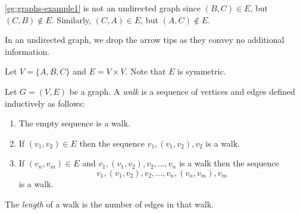 \documentclass{amsart}
\begin{document}
\begin{rmk}
  \label{rmk:example1-not-undirected}
  \cref{eg:graphs-example1} is not an undirected graph since $(B,C) \in E$, but $(C,B) \notin E$.
  Similarly, $(C,A) \in E$, but $(A,C) \notin E$.
\end{rmk}

\begin{rmk}
  \label{rmk:drop-arrows-in-undirected-graphs}
  In an undirected graph, we drop the arrow tips as they convey no additional information.
\end{rmk}

\begin{eg}
  \label{eg:graphs-example2}
  Let $V = \{A, B, C\}$ and $E = V \times V$.
  Note that $E$ is symmetric.
  \begin{center}
  \end{center}
\end{eg}

\begin{defn}
  \label{defn:walks}
  Let $G = (V,E)$ be a graph.
  A \emph{walk} is a sequence of vertices and edges defined inductively as follows:
  \begin{enumerate}
  \item The empty sequence is a walk.
  \item If $(v_{1},v_{2}) \in E$ then the sequence $v_{1},(v_{1},v_{2}),v_{2}$ is a walk.
  \item If $(v_{n}, v_{m}) \in E$ and $v_{1},(v_{1},v_{2}),v_{2},\ldots,v_{n}$ is a walk then the sequence
    \[
      v_{1},(v_{1},v_{2}),v_{2},\ldots,v_{n},(v_{n},v_{m}),v_{m}
    \]
    is a walk.
  \end{enumerate}
\end{defn}

\begin{defn}
  \label{defn:walks-length}
  The \emph{length} of a walk is the number of edges in that walk.
\end{defn}
\end{document}

